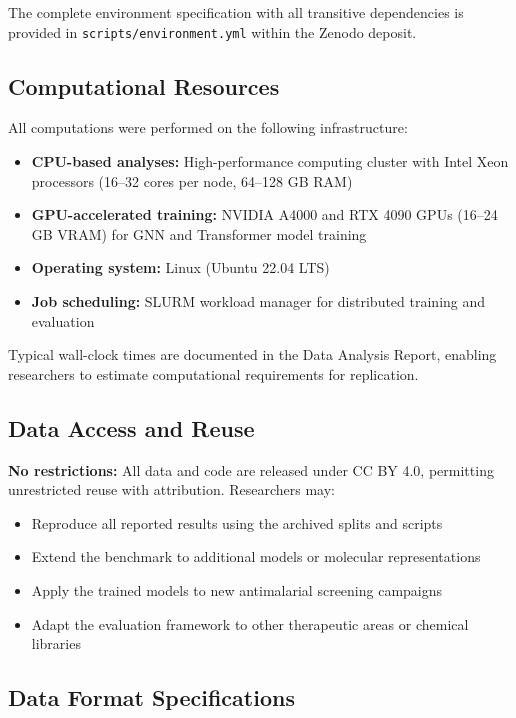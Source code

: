 \documentclass[11pt,a4paper]{article}
\begin{document}
\noindent The complete environment specification with all transitive dependencies is provided in \texttt{scripts/environment.yml} within the Zenodo deposit.

\subsection*{Computational Resources}

All computations were performed on the following infrastructure:

\begin{itemize}[leftmargin=*,itemsep=0.3em]
\item \textbf{CPU-based analyses:} High-performance computing cluster with Intel Xeon processors (16--32 cores per node, 64--128 GB RAM)
\item \textbf{GPU-accelerated training:} NVIDIA A4000 and RTX 4090 GPUs (16--24 GB VRAM) for GNN and Transformer model training
\item \textbf{Operating system:} Linux (Ubuntu 22.04 LTS)
\item \textbf{Job scheduling:} SLURM workload manager for distributed training and evaluation
\end{itemize}

\noindent Typical wall-clock times are documented in the Data Analysis Report, enabling researchers to estimate computational requirements for replication.

\subsection*{Data Access and Reuse}

\textbf{No restrictions:} All data and code are released under CC BY 4.0, permitting unrestricted reuse with attribution. Researchers may:

\begin{itemize}[leftmargin=*,itemsep=0.3em]
\item Reproduce all reported results using the archived splits and scripts
\item Extend the benchmark to additional models or molecular representations
\item Apply the trained models to new antimalarial screening campaigns
\item Adapt the evaluation framework to other therapeutic areas or chemical libraries
\end{itemize}

\subsection*{Data Format Specifications}
\end{document}
